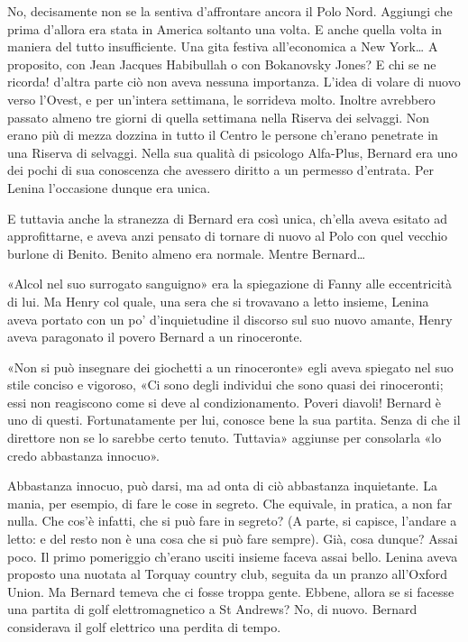 \documentclass[
a5paper, %
10pt, %
twoside, 
onecolumn, %
openany, %
]{memoir}
\begin{document}
No, decisamente non se la sentiva d’affrontare ancora il Polo Nord. Aggiungi che prima d’allora era stata in America soltanto una volta. E anche quella volta in maniera del tutto insufficiente. Una gita festiva all’economica a New York… A proposito, con Jean Jacques Habibullah o con Bokanovsky Jones? E chi se ne ricorda! d’altra parte ciò non aveva nessuna importanza. L’idea di volare di nuovo verso l’Ovest, e per un’intera settimana, le sorrideva molto. Inoltre avrebbero passato almeno tre giorni di quella settimana nella Riserva dei selvaggi. Non erano più di mezza dozzina in tutto il Centro le persone ch’erano penetrate in una Riserva di selvaggi. Nella sua qualità di psicologo Alfa-Plus, Bernard era uno dei pochi di sua conoscenza che avessero diritto a un permesso d’entrata. Per Lenina l’occasione dunque era unica.

E tuttavia anche la stranezza di Bernard era così unica, ch’ella aveva esitato ad approfittarne, e aveva anzi pensato di tornare di nuovo al Polo con quel vecchio burlone di Benito. Benito almeno era normale. Mentre Bernard…

«Alcol nel suo surrogato sanguigno» era la spiegazione di Fanny alle eccentricità di lui. Ma Henry col quale, una sera che si trovavano a letto insieme, Lenina aveva portato con un po’ d’inquietudine il discorso sul suo nuovo amante, Henry aveva paragonato il povero Bernard a un rinoceronte.

«Non si può insegnare dei giochetti a un rinoceronte» egli aveva spiegato nel suo stile conciso e vigoroso, «Ci sono degli individui che sono quasi dei rinoceronti; essi non reagiscono come si deve al condizionamento. Poveri diavoli! Bernard è uno di questi. Fortunatamente per lui, conosce bene la sua partita. Senza di che il direttore non se lo sarebbe certo tenuto. Tuttavia» aggiunse per consolarla «lo credo abbastanza innocuo».

Abbastanza innocuo, può darsi, ma ad onta di ciò abbastanza inquietante. La mania, per esempio, di fare le cose in segreto. Che equivale, in pratica, a non far nulla. Che cos’è infatti, che si può fare in segreto? (A parte, si capisce, l’andare a letto: e del resto non è una cosa che si può fare sempre). Già, cosa dunque? Assai poco. Il primo pomeriggio ch’erano usciti insieme faceva assai bello. Lenina aveva proposto una nuotata al Torquay country club, seguita da un pranzo all’Oxford Union. Ma Bernard temeva che ci fosse troppa gente. Ebbene, allora se si facesse una partita di golf elettromagnetico a St Andrews? No, di nuovo. Bernard considerava il golf elettrico una perdita di tempo.
\end{document}
